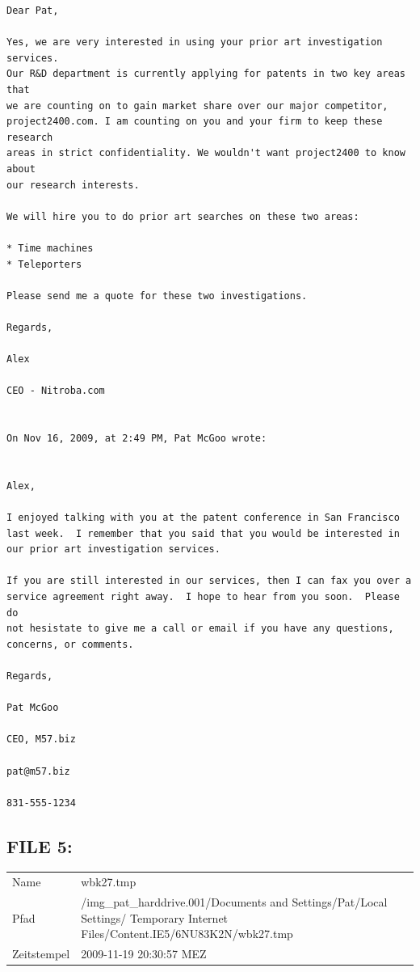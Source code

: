 \begin{lstlisting}
Dear Pat,

Yes, we are very interested in using your prior art investigation services. 
Our R&D department is currently applying for patents in two key areas that 
we are counting on to gain market share over our major competitor, 
project2400.com. I am counting on you and your firm to keep these research 
areas in strict confidentiality. We wouldn't want project2400 to know about 
our research interests.

We will hire you to do prior art searches on these two areas:

* Time machines
* Teleporters

Please send me a quote for these two investigations.

Regards,

Alex

CEO - Nitroba.com


On Nov 16, 2009, at 2:49 PM, Pat McGoo wrote:


Alex,

I enjoyed talking with you at the patent conference in San Francisco
last week.  I remember that you said that you would be interested in
our prior art investigation services.

If you are still interested in our services, then I can fax you over a
service agreement right away.  I hope to hear from you soon.  Please do
not hesistate to give me a call or email if you have any questions,
concerns, or comments.

Regards,

Pat McGoo

CEO, M57.biz

pat@m57.biz

831-555-1234
\end{lstlisting}

\subsection{FILE 5:}
\label{sec:pat_emails_5}	

\begin{table}[htb]
	\begin{tabular}{p{2cm} p{13.5cm}}
		Name & wbk27.tmp\\
		Pfad & /img_pat_harddrive.001/Documents and Settings/Pat/Local Settings/ Temporary Internet Files/Content.IE5/6NU83K2N/wbk27.tmp\\
		Zeitstempel & 2009-11-19 20:30:57 MEZ
	\end{tabular}
\end{table}	

